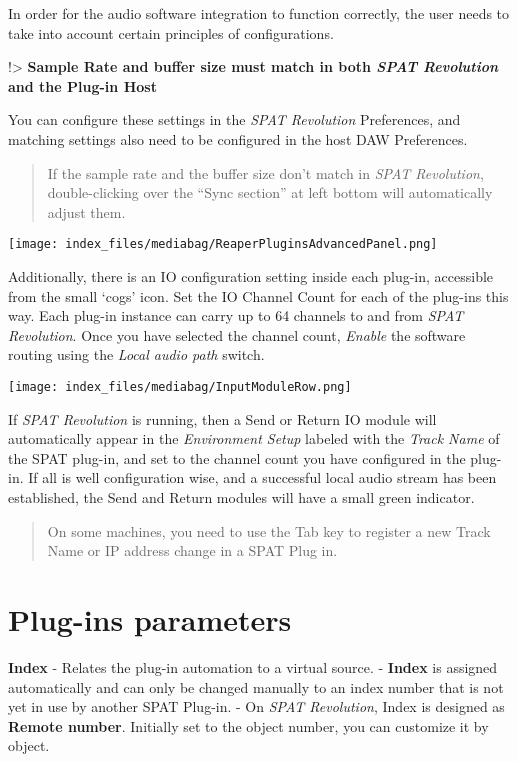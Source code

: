 \documentclass[
  letterpaper,
  DIV=11,
  numbers=noendperiod]{scrreport}
\begin{document}
In order for the audio software integration to function correctly, the
user needs to take into account certain principles of configurations.

!\textgreater{} \textbf{Sample Rate and buffer size must match in both
\emph{SPAT Revolution} and the Plug-in Host}

You can configure these settings in the \emph{SPAT Revolution}
Preferences, and matching settings also need to be configured in the
host DAW Preferences.

\begin{quote}
If the sample rate and the buffer size don't match in \emph{SPAT
Revolution}, double-clicking over the ``Sync section'' at left bottom
will automatically adjust them.
\end{quote}

\texttt{[image: index\_files/mediabag/ReaperPluginsAdvancedPanel.png]}

Additionally, there is an IO configuration setting inside each plug-in,
accessible from the small `cogs' icon. Set the IO Channel Count for each
of the plug-ins this way. Each plug-in instance can carry up to 64
channels to and from \emph{SPAT Revolution}. Once you have selected the
channel count, \emph{Enable} the software routing using the \emph{Local
audio path} switch.

\texttt{[image: index\_files/mediabag/InputModuleRow.png]}

If \emph{SPAT Revolution} is running, then a Send or Return IO module
will automatically appear in the \emph{Environment Setup} labeled with
the \emph{Track Name} of the SPAT plug-in, and set to the channel count
you have configured in the plug-in. If all is well configuration wise,
and a successful local audio stream has been established, the Send and
Return modules will have a small green indicator.

\begin{quote}
On some machines, you need to use the Tab key to register a new Track
Name or IP address change in a SPAT Plug in.
\end{quote}

\hypertarget{plug-ins-parameters}{%
\section{Plug-ins parameters}\label{plug-ins-parameters}}

\textbf{Index} - Relates the plug-in automation to a virtual source. -
\textbf{Index} is assigned automatically and can only be changed
manually to an index number that is not yet in use by another SPAT
Plug-in. - On \emph{SPAT Revolution}, Index is designed as
\textbf{Remote number}. Initially set to the object number, you can
customize it by object.
\end{document}
